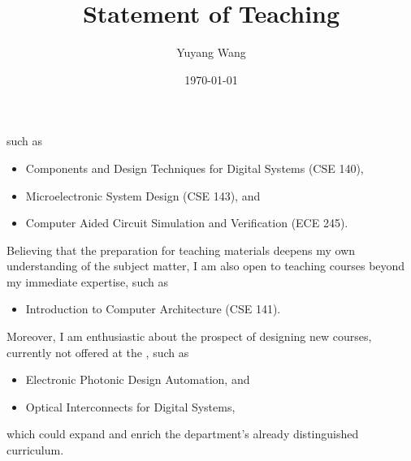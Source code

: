 



\title{Statement of Teaching}

\def\courseOneName{Components and Design Techniques for Digital Systems}
\def\courseOneNumber{CSE 140}
\def\courseTwoName{Microelectronic System Design}
\def\courseTwoNumber{CSE 143}
\def\courseThreeName{Computer Aided Circuit Simulation and Verification }
\def\courseThreeNumber{ECE 245}
\def\courseFourName{Introduction to Computer Architecture}
\def\courseFourNumber{CSE 141}
\def\courseFiveName{Computer Communication Networks}
\def\courseFiveNumber{CSE 222A}
\def\courseSixName{Electronic Photonic Design Automation}
\def\courseSevenName{Optical Interconnects for Digital Systems}

\def\rsCustom{%
such as 
\begin{itemize}[nosep]
    \item \courseOneName{} (\courseOneNumber{}),
    \item \courseTwoName{} (\courseTwoNumber{}), and
    \item \courseThreeName{} (\courseThreeNumber{}).
\end{itemize}
Believing that the preparation for teaching materials deepens my own understanding of the subject matter, I am also open to teaching courses beyond my immediate expertise, such as
\begin{itemize}[nosep]
    \item \courseFourName{} (\courseFourNumber{}).
\end{itemize}
Moreover, I am enthusiastic about the prospect of designing new courses, currently not offered at the \appSchool{}, such as
\begin{itemize}[nosep]
    \item \courseSixName{}, and 
    \item \courseSevenName{},
\end{itemize}
which could expand and enrich the department's already distinguished curriculum.
}

\author{Yuyang Wang}
\date{\today}
\makeatletter
\fancyfoot[L]{\scshape \MakeLowercase{\@author}}
\fancyfoot[R]{{\scshape \MakeLowercase{\@title}}\quad{\LARGE\sfrac{\thepage}{\pageref*{LastPage}}}}
\makeatother



\maketitle%
\thispagestyle{fancy}


\rsCustom{}


\footnotesize


